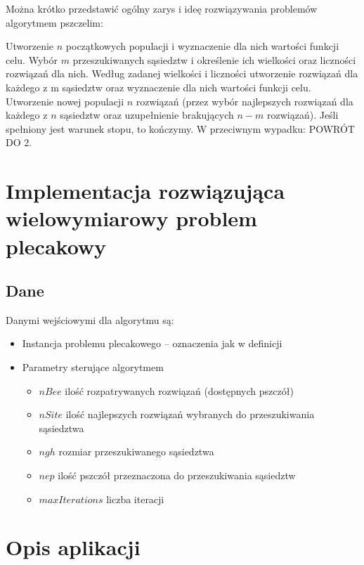 \documentclass[a4paper,12pt,notitlepage]{mwrep}
\begin{document}
Można krótko przedstawić ogólny zarys i ideę rozwiązywania problemów algorytmem pszczelim:
\begin{enumerate}
	\fe	Utworzenie $n$ początkowych populacji i wyznaczenie dla nich wartości funkcji celu.
	\fe	Wybór $m$ przeszukiwanych sąsiedztw i określenie ich wielkości oraz liczności rozwiązań dla nich.
	\fe	Według zadanej wielkości i liczności utworzenie rozwiązań dla każdego z m sąsiedztw oraz wyznaczenie dla nich wartości funkcji celu.
	\fe	Utworzenie nowej populacji $n$ rozwiązań (przez wybór najlepszych rozwiązań dla każdego z $n$ sąsiedztw oraz uzupełnienie brakujących $n-m$ rozwiązań).
	\fe	Jeśli spełniony jest warunek stopu, to kończymy. W przeciwnym wypadku: POWRÓT DO 2.
\end{enumerate}

\chapter{Implementacja rozwiązująca wielowymiarowy problem plecakowy}
\section{Dane}
Danymi wejściowymi dla algorytmu są:
\begin{itemize}
\item Instancja problemu plecakowego -- oznaczenia jak w definicji
\item Parametry sterujące algorytmem
\begin{itemize}
\item $nBee$ ilość rozpatrywanych rozwiązań (dostępnych pszczół)
\item $nSite$ ilość najlepszych rozwiązań wybranych do przeszukiwania sąsiedztwa
\item $ngh$ rozmiar przeszukiwanego sąsiedztwa
\item $nep$ ilość pszczół przeznaczona do przeszukiwania sąsiedztw
\item $maxIterations$ liczba iteracji
\end{itemize}
\end{itemize}

\chapter{Opis aplikacji}
\end{document}
